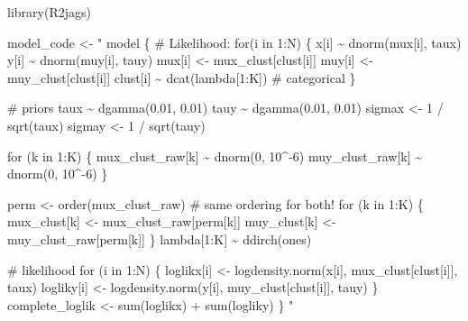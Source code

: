 \documentclass[
  oneside]{book}
\newenvironment{Shaded}{\begin{snugshade}}{\end{snugshade}}
\newcommand{\FunctionTok}[1]{\textcolor[rgb]{0.00,0.00,0.00}{#1}}
\newcommand{\NormalTok}[1]{#1}
\newcommand{\OtherTok}[1]{\textcolor[rgb]{0.56,0.35,0.01}{#1}}
\newcommand{\StringTok}[1]{\textcolor[rgb]{0.31,0.60,0.02}{#1}}
\begin{document}
\begin{Shaded}
\begin{Highlighting}[]
\FunctionTok{library}\NormalTok{(R2jags)}

\NormalTok{model\_code }\OtherTok{\textless{}{-}} \StringTok{"}
\StringTok{model \{}
\StringTok{  \# Likelihood:}
\StringTok{  for(i in 1:N) \{}
\StringTok{    x[i] \textasciitilde{} dnorm(mux[i], taux)}
\StringTok{    y[i] \textasciitilde{} dnorm(muy[i], tauy)}
\StringTok{    mux[i] \textless{}{-} mux\_clust[clust[i]]}
\StringTok{    muy[i] \textless{}{-} muy\_clust[clust[i]]}
\StringTok{    clust[i] \textasciitilde{} dcat(lambda[1:K]) \# categorical}
\StringTok{  \}}

\StringTok{  \# priors}
\StringTok{  taux \textasciitilde{} dgamma(0.01, 0.01)}
\StringTok{  tauy \textasciitilde{} dgamma(0.01, 0.01)}
\StringTok{  sigmax \textless{}{-} 1 / sqrt(taux)}
\StringTok{  sigmay \textless{}{-} 1 / sqrt(tauy)}

\StringTok{  for (k in 1:K) \{}
\StringTok{    mux\_clust\_raw[k] \textasciitilde{} dnorm(0, 10\^{}{-}6)}
\StringTok{    muy\_clust\_raw[k] \textasciitilde{} dnorm(0, 10\^{}{-}6)}
\StringTok{  \}}

\StringTok{  perm \textless{}{-} order(mux\_clust\_raw) \# same ordering for both!}
\StringTok{  for (k in 1:K) \{}
\StringTok{    mux\_clust[k] \textless{}{-} mux\_clust\_raw[perm[k]]}
\StringTok{    muy\_clust[k] \textless{}{-} muy\_clust\_raw[perm[k]]}
\StringTok{  \}}
\StringTok{  lambda[1:K] \textasciitilde{} ddirch(ones)}

\StringTok{  \# likelihood}
\StringTok{  for (i in 1:N) \{}
\StringTok{    loglikx[i] \textless{}{-} logdensity.norm(x[i], mux\_clust[clust[i]], taux)}
\StringTok{    logliky[i] \textless{}{-} logdensity.norm(y[i], muy\_clust[clust[i]], tauy)}
\StringTok{  \}}
\StringTok{  complete\_loglik \textless{}{-} sum(loglikx) + sum(logliky)}
\StringTok{\}}
\StringTok{"}


\end{Highlighting}
\end{Shaded}
\end{document}
